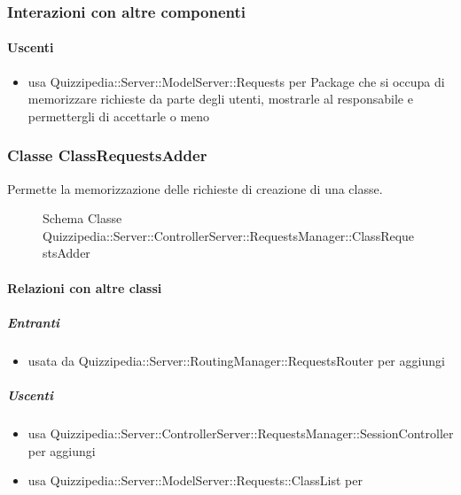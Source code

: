 \subsubsection{Interazioni con altre componenti}
\paragraph{Uscenti}
\begin{itemize}
\item usa Quizzipedia::Server::ModelServer::Requests per Package che si occupa di memorizzare richieste da parte degli utenti, mostrarle al responsabile e permettergli di accettarle o meno
\end{itemize}
\subsubsection{Classe ClassRequestsAdder}
Permette la memorizzazione delle richieste di creazione di una classe.
\begin{figure}[H]
\centering
\noindent{}
\caption[Schema Classe ClassRequestsAdder]{Schema Classe Quizzipedia::Server::ControllerServer::RequestsManager::ClassRequestsAdder}
\end{figure}
\paragraph{Relazioni con altre classi}
\subparagraph{Entranti}
\begin{itemize}
\item usata da Quizzipedia::Server::RoutingManager::RequestsRouter per aggiungi
\end{itemize}
\subparagraph{Uscenti}
\begin{itemize}
\item usa Quizzipedia::Server::ControllerServer::RequestsManager::SessionController per aggiungi
\item usa Quizzipedia::Server::ModelServer::Requests::ClassList per 
\end{itemize}
